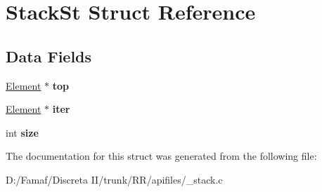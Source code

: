 \hypertarget{struct_stack_st}{\section{Stack\+St Struct Reference}
\label{struct_stack_st}
}
\subsection*{Data Fields}
\begin{DoxyCompactItemize}
\item 
\hypertarget{struct_stack_st_a910fec847a84d42e1b7aef830c001a12}{\hyperlink{struct_element_st}{Element} $\ast$ {\bfseries top}}\label{struct_stack_st_a910fec847a84d42e1b7aef830c001a12}

\item 
\hypertarget{struct_stack_st_a2dee114f88e9fd45b2dd493105ac455e}{\hyperlink{struct_element_st}{Element} $\ast$ {\bfseries iter}}\label{struct_stack_st_a2dee114f88e9fd45b2dd493105ac455e}

\item 
\hypertarget{struct_stack_st_a439227feff9d7f55384e8780cfc2eb82}{int {\bfseries size}}\label{struct_stack_st_a439227feff9d7f55384e8780cfc2eb82}

\end{DoxyCompactItemize}


The documentation for this struct was generated from the following file\+:\begin{DoxyCompactItemize}
\item 
D\+:/\+Famaf/\+Discreta I\+I/trunk/\+R\+R/apifiles/\+\_\+stack.\+c\end{DoxyCompactItemize}
